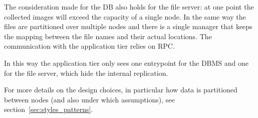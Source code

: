 \begin{description}
    The consideration made for the DB also holds for the file server: at one
    point the collected images will exceed the capacity of a single node.
    In the same way the files are partitioned over multiple nodes and there is
    a single manager that keeps the mapping between the file names and their
    actual locations. The communication with the application tier relies on RPC.
    
    In this way the application tier only sees one entrypoint for the DBMS and
    one for the file server, which hide the internal replication.
\end{description}

\noindent
For more details on the design choices, in particular how data is partitioned
between nodes (and also under which assumptions),
see section~\ref{sec:styles_patterns}.
